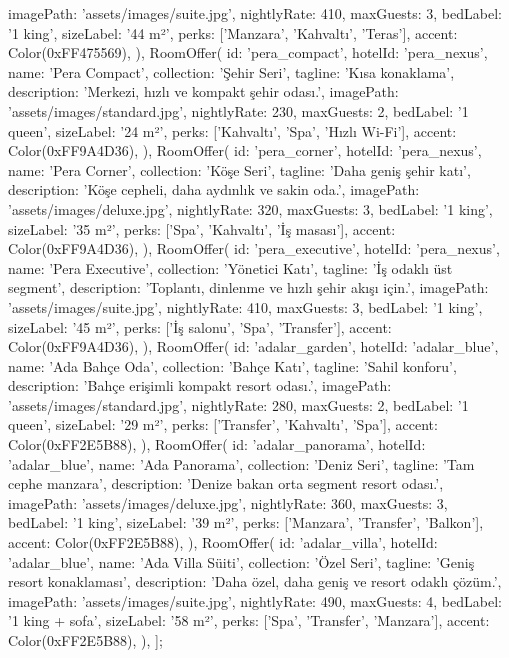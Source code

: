 \documentclass[11pt,a4paper]{article}
\begin{document}
\begin{codeblock}
    imagePath: 'assets/images/suite.jpg',
    nightlyRate: 410,
    maxGuests: 3,
    bedLabel: '1 king',
    sizeLabel: '44 m²',
    perks: ['Manzara', 'Kahvaltı', 'Teras'],
    accent: Color(0xFF475569),
  ),
  RoomOffer(
    id: 'pera_compact',
    hotelId: 'pera_nexus',
    name: 'Pera Compact',
    collection: 'Şehir Seri',
    tagline: 'Kısa konaklama',
    description: 'Merkezi, hızlı ve kompakt şehir odası.',
    imagePath: 'assets/images/standard.jpg',
    nightlyRate: 230,
    maxGuests: 2,
    bedLabel: '1 queen',
    sizeLabel: '24 m²',
    perks: ['Kahvaltı', 'Spa', 'Hızlı Wi-Fi'],
    accent: Color(0xFF9A4D36),
  ),
  RoomOffer(
    id: 'pera_corner',
    hotelId: 'pera_nexus',
    name: 'Pera Corner',
    collection: 'Köşe Seri',
    tagline: 'Daha geniş şehir katı',
    description: 'Köşe cepheli, daha aydınlık ve sakin oda.',
    imagePath: 'assets/images/deluxe.jpg',
    nightlyRate: 320,
    maxGuests: 3,
    bedLabel: '1 king',
    sizeLabel: '35 m²',
    perks: ['Spa', 'Kahvaltı', 'İş masası'],
    accent: Color(0xFF9A4D36),
  ),
  RoomOffer(
    id: 'pera_executive',
    hotelId: 'pera_nexus',
    name: 'Pera Executive',
    collection: 'Yönetici Katı',
    tagline: 'İş odaklı üst segment',
    description: 'Toplantı, dinlenme ve hızlı şehir akışı için.',
    imagePath: 'assets/images/suite.jpg',
    nightlyRate: 410,
    maxGuests: 3,
    bedLabel: '1 king',
    sizeLabel: '45 m²',
    perks: ['İş salonu', 'Spa', 'Transfer'],
    accent: Color(0xFF9A4D36),
  ),
  RoomOffer(
    id: 'adalar_garden',
    hotelId: 'adalar_blue',
    name: 'Ada Bahçe Oda',
    collection: 'Bahçe Katı',
    tagline: 'Sahil konforu',
    description: 'Bahçe erişimli kompakt resort odası.',
    imagePath: 'assets/images/standard.jpg',
    nightlyRate: 280,
    maxGuests: 2,
    bedLabel: '1 queen',
    sizeLabel: '29 m²',
    perks: ['Transfer', 'Kahvaltı', 'Spa'],
    accent: Color(0xFF2E5B88),
  ),
  RoomOffer(
    id: 'adalar_panorama',
    hotelId: 'adalar_blue',
    name: 'Ada Panorama',
    collection: 'Deniz Seri',
    tagline: 'Tam cephe manzara',
    description: 'Denize bakan orta segment resort odası.',
    imagePath: 'assets/images/deluxe.jpg',
    nightlyRate: 360,
    maxGuests: 3,
    bedLabel: '1 king',
    sizeLabel: '39 m²',
    perks: ['Manzara', 'Transfer', 'Balkon'],
    accent: Color(0xFF2E5B88),
  ),
  RoomOffer(
    id: 'adalar_villa',
    hotelId: 'adalar_blue',
    name: 'Ada Villa Süiti',
    collection: 'Özel Seri',
    tagline: 'Geniş resort konaklaması',
    description: 'Daha özel, daha geniş ve resort odaklı çözüm.',
    imagePath: 'assets/images/suite.jpg',
    nightlyRate: 490,
    maxGuests: 4,
    bedLabel: '1 king + sofa',
    sizeLabel: '58 m²',
    perks: ['Spa', 'Transfer', 'Manzara'],
    accent: Color(0xFF2E5B88),
  ),
];
\end{codeblock}
\end{document}
